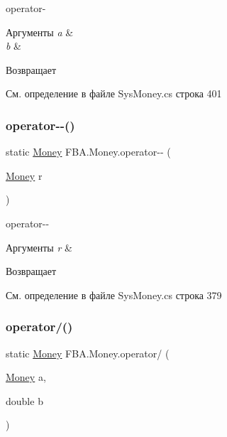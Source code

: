 operator-\/ 


\begin{DoxyParams}{Аргументы}
{\em a} & \\
\hline
{\em b} & \\
\hline
\end{DoxyParams}
\begin{DoxyReturn}{Возвращает}

\end{DoxyReturn}


См. определение в файле Sys\+Money.\+cs строка 401

\mbox{\label{struct_f_b_a_1_1_money_aa989cd8c47a2d00ce8da9d548509e3c9}} 
\subsubsection{\texorpdfstring{operator-\/-\/()}{operator--()}}
{\footnotesize\ttfamily static \mbox{\hyperlink{struct_f_b_a_1_1_money}{Money}} F\+B\+A.\+Money.\+operator-\/-\/ (\begin{DoxyParamCaption}\item[{\mbox{\hyperlink{struct_f_b_a_1_1_money}{Money}}}]{r }\end{DoxyParamCaption})\hspace{0.3cm}{\ttfamily [static]}}



operator-\/-\/ 


\begin{DoxyParams}{Аргументы}
{\em r} & \\
\hline
\end{DoxyParams}
\begin{DoxyReturn}{Возвращает}

\end{DoxyReturn}


См. определение в файле Sys\+Money.\+cs строка 379

\mbox{\label{struct_f_b_a_1_1_money_ab02254b5b9522985c3776b8de6161660}} 
\subsubsection{\texorpdfstring{operator/()}{operator/()}}
{\footnotesize\ttfamily static \mbox{\hyperlink{struct_f_b_a_1_1_money}{Money}} F\+B\+A.\+Money.\+operator/ (\begin{DoxyParamCaption}\item[{\mbox{\hyperlink{struct_f_b_a_1_1_money}{Money}}}]{a,  }\item[{double}]{b }\end{DoxyParamCaption})\hspace{0.3cm}{\ttfamily [static]}}




